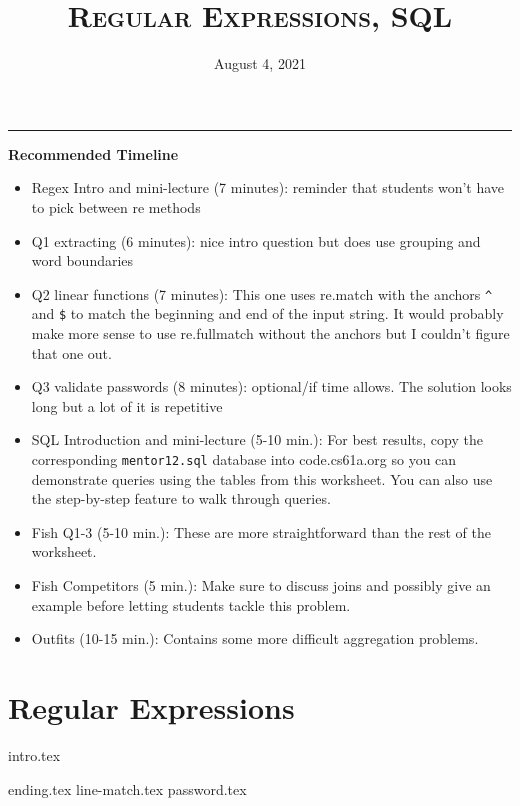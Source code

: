 \documentclass{exam}
\title{\textsc{Regular Expressions, SQL}}
\date{August 4, 2021}
\begin{document}
\maketitle
\rule{\textwidth}{0.15em}
\fontsize{12}{15}\selectfont

\begin{guide}
\begin{blocksection}
    \textbf{Recommended Timeline}
    \begin{itemize}
        \item Regex Intro and mini-lecture (7 minutes): reminder that students won't have to pick between re methods
        \item Q1 extracting (6 minutes): nice intro question but does use grouping and word boundaries
        \item Q2 linear functions (7 minutes): This one uses re.match with the anchors \lstinline{^} and \lstinline{$} to match the beginning and end of the input string.
        It would probably make more sense to use re.fullmatch without the anchors but I couldn't figure that one out.
        \item Q3 validate passwords (8 minutes): optional/if time allows. The solution looks long but a lot of it is repetitive
        \item SQL Introduction and mini-lecture (5-10 min.): For best results, copy the corresponding 
        \texttt{mentor12.sql} database into code.cs61a.org so you can demonstrate queries using 
        the tables from this worksheet. You can also use the step-by-step feature to walk through queries.
        \item Fish Q1-3 (5-10 min.): These are more straightforward than the rest of
        the worksheet.
        \item Fish Competitors (5 min.): Make sure to discuss joins and possibly give an example
        before letting students tackle this problem.
        \item Outfits (10-15 min.): Contains some more difficult aggregation problems.
    \end{itemize}
\end{blocksection}
\newpage
\end{guide}

\section{Regular Expressions}
{intro.tex}
\begin{questions}
{ending.tex}
{line-match.tex}
{password.tex}
\end{questions}
\end{document}
